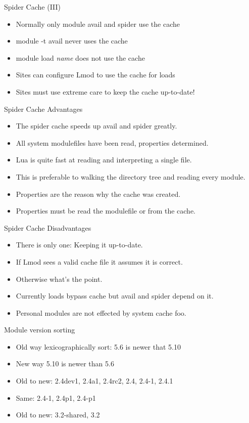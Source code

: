 \documentclass{beamer}
\begin{document}
\begin{frame}{Spider Cache (III)}
  \begin{itemize}
    \item Normally only module avail and spider use the cache
    \item module -t avail never uses the cache
    \item module load \emph{name} does not use the cache
    \item Sites can configure Lmod to use the cache for loads
    \item Sites must use extreme care to keep the cache up-to-date!
  \end{itemize}
\end{frame}

\begin{frame}{Spider Cache Advantages}
  \begin{itemize}
    \item The spider cache speeds up avail and spider greatly.
    \item All system modulefiles have been read, properties determined.
    \item Lua is quite fast at reading and interpreting a single file.
    \item This is preferable to walking the directory tree and reading
      every module.
    \item Properties are the reason why the cache was created.
    \item Properties must be read the modulefile or from the cache.
  \end{itemize}
\end{frame}

\begin{frame}{Spider Cache Disadvantages}
  \begin{itemize}
    \item There is only one: Keeping it up-to-date.
    \item If Lmod sees a valid cache file it assumes it is correct.
    \item Otherwise what's the point.
    \item Currently loads bypass cache but avail and spider depend on it.
    \item Personal modules are not effected by system cache foo.
  \end{itemize}
\end{frame}

\begin{frame}{Module version sorting}
  \begin{itemize}
    \item Old way lexicographically sort: 5.6 is newer that 5.10
    \item New way 5.10 is newer than 5.6
    \item Old to new: 2.4dev1, 2.4a1, 2.4rc2, 2.4, 2.4-1, 2.4.1
    \item Same: 2.4-1, 2.4p1, 2.4-p1
    \item Old to new: 3.2-shared, 3.2
  \end{itemize}
\end{frame}
\end{document}
